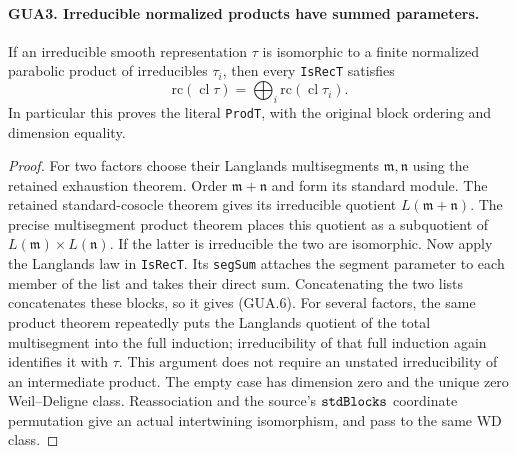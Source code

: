 \documentclass[11pt,a4paper]{article}
\numberwithin{equation}{section}
\theoremstyle{remark}\newtheorem{remark}[theorem]{Remark}
\begin{document}
\paragraph{GUA3. Irreducible normalized products have summed parameters.}
\label{claim:GUA3}
If an irreducible smooth representation $\tau$ is isomorphic
to a finite normalized parabolic product of irreducibles
$\tau_i$, then every \texttt{Is\allowbreak Rec\allowbreak T} satisfies
\[
          \mathrm{rc}(\operatorname{cl}\tau)
                      =\bigoplus_i\mathrm{rc}(\operatorname{cl}\tau_i).
                                                        \tag{GUA.6}
\]
In particular this proves the literal \texttt{Prod\allowbreak T}, with
the original block ordering and dimension equality.
\begin{proof}
For two factors choose their Langlands multisegments
$\mathfrak m,\mathfrak n$ using the retained exhaustion
theorem.  Order $\mathfrak m+\mathfrak n$ and form its
standard module.  The retained standard-cosocle theorem
gives its irreducible quotient $L(\mathfrak m+\mathfrak n)$.
The precise multisegment product theorem places this quotient
as a subquotient of $L(\mathfrak m)\times L(\mathfrak n)$.
If the latter is irreducible the two are isomorphic.
Now apply the Langlands law in \texttt{Is\allowbreak Rec\allowbreak T}.  Its
\texttt{seg\allowbreak Sum} attaches the segment parameter to each
member of the list and takes their direct sum.  Concatenating
the two lists concatenates these blocks, so it gives (GUA.6).
For several factors, the same product theorem repeatedly
puts the Langlands quotient of the total multisegment into
the full induction; irreducibility of that full induction
again identifies it with $\tau$.  This argument does not
require an unstated irreducibility of an intermediate product.
The empty case has dimension zero and the unique zero
Weil--Deligne class.  Reassociation and the source's
$\texttt{std\allowbreak Blocks}$ coordinate permutation give an actual
intertwining isomorphism, and pass to the same WD class.
\end{proof}

\end{document}
